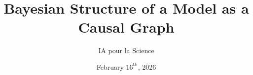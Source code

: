 \documentclass{beamer}
\title{Bayesian Structure of a Model as a Causal Graph}
\author{IA pour la Science}
\date{February $16^\text{th}$, 2026}
\begin{document}
\begin{frame}
  \titlepage
\end{frame}
\end{document}
